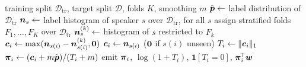 \begin{algorithm}[t]
\caption{Leakage-free speaker credit history}
\label{alg:history}
\begin{algorithmic}[1]
\Require training split $\mathcal{D}_{\text{tr}}$, target split $\mathcal{D}$,
 folds $K$, smoothing $m$
\State $\hat{\boldsymbol{p}} \gets$ label distribution of $\mathcal{D}_{\text{tr}}$
\State $\boldsymbol{n}_s \gets$ label histogram of speaker $s$ over
 $\mathcal{D}_{\text{tr}}$, for all $s$
  \State assign stratified folds $F_1,\dots,F_K$ over $\mathcal{D}_{\text{tr}}$
    \State $\boldsymbol{n}^{(k)}_s \gets$ histogram of $s$ restricted to $F_k$
      \State $\boldsymbol{c}_i \gets \max(\boldsymbol{n}_{s(i)} - \boldsymbol{n}^{(k)}_{s(i)}, \boldsymbol{0})$
    \EndFor
  \EndFor
\Else
    \State $\boldsymbol{c}_i \gets \boldsymbol{n}_{s(i)}$ \quad ($\boldsymbol{0}$ if $s(i)$ unseen)
  \EndFor
\EndIf
{}
  \State $T_i \gets \|\boldsymbol{c}_i\|_1$
  \State $\boldsymbol{\pi}_i \gets (\boldsymbol{c}_i + m\hat{\boldsymbol{p}})/(T_i + m)$
  \State emit $\boldsymbol{\pi}_i$, $\log(1+T_i)$, $\mathbf{1}[T_i = 0]$,
   $\boldsymbol{\pi}_i^{\!\top}\boldsymbol{w}$
\EndFor
\end{algorithmic}
\end{algorithm}
